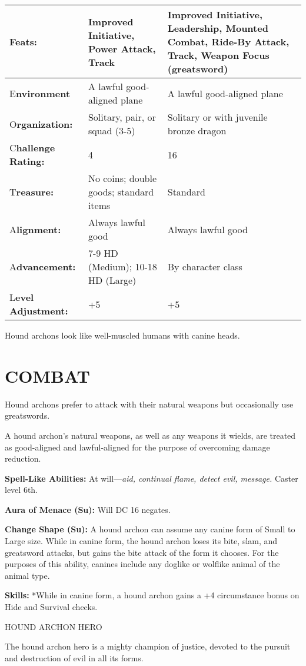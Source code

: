 \documentclass{article}
\begin{document}
\begin{tabular}{|>{\raggedright}p{47pt}|>{\raggedright}p{133pt}|>{\raggedright}p{133pt}|}
\hline
F\textbf{eats:} & Improved Initiative, Power Attack, Track & Improved Initiative, 
Leadership, Mounted Combat, Ride-By Attack, Track, Weapon Focus (greatsword) \tabularnewline
\hline
E\textbf{nvironment} & A lawful good-aligned plane & A lawful good-aligned plane\tabularnewline
\hline
O\textbf{rganization:} & Solitary, pair, or squad (3-5) & Solitary or with juvenile 
bronze dragon\tabularnewline
\hline
C\textbf{hallenge Rating:} & 4 & 16\tabularnewline
\hline
T\textbf{reasure:} & No coins; double goods; standard items & Standard\tabularnewline
\hline
A\textbf{lignment:} & Always lawful good & Always lawful good\tabularnewline
\hline
A\textbf{dvancement:} & 7-9 HD (Medium); 10-18 HD (Large) & By character class\tabularnewline
\hline
L\textbf{evel Adjustment:} & +5 & +5\tabularnewline
\hline
\end{tabular}

Hound archons look like well-muscled humans with canine heads.

\section*{COMBAT}

Hound archons prefer to attack with their natural weapons but occasionally use 
greatswords.

A hound archon's natural weapons, as well as any weapons it wields, are treated 
as good-aligned and lawful-aligned for the purpose of overcoming damage reduction.

\textbf{Spell-Like Abilities:} At will---\textit{aid, continual flame, detect evil, 
message. }Caster level 6th.

\textbf{Aura of Menace (Su): }Will DC 16 negates.

\textbf{Change Shape (Su):} A hound archon can assume any canine form of Small 
to Large size. While in canine form, the hound archon loses its bite, slam, and 
greatsword attacks, but gains the bite attack of the form it chooses. For the purposes 
of this ability, canines include any doglike or wolflike animal of the animal type.

\textbf{Skills: }*While in canine form, a hound archon gains a +4 circumstance 
bonus on Hide and Survival checks.

\vspace{12pt}
HOUND ARCHON HERO

The hound archon hero is a mighty champion of justice, devoted to the pursuit and 
destruction of evil in all its forms. 
\end{document}
